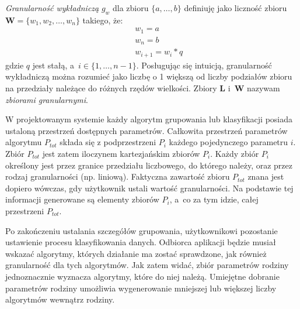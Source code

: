 \documentclass[../thesis.tex]{subfiles}
\begin{document}
\textit{Granularność wykładniczą} $g_w$ dla zbioru $\{a, \ldots, b\}$ definiuję jako liczność zbioru $\textbf{W} = \{w_1, w_2, \ldots, w_n\}$ takiego, że:
\begin{eqnarray*}
&& w_1 = a~\\
&& w_n = b \\
&& w_{i+1} = w_i * q
\end{eqnarray*}
gdzie $q$ jest stałą, a~$i \in \{1, \ldots, n-1\}$. Posługując się intuicją, granularność wykładniczą można rozumieć jako liczbę o 1 większą od liczby podziałów zbioru na przedziały należące do różnych rzędów wielkości. Zbiory $\textbf{L}$ i~$\textbf{W}$ nazywam \textit{zbiorami granularnymi}.

W projektowanym systemie każdy algorytm grupowania lub klasyfikacji posiada ustaloną przestrzeń dostępnych parametrów. Całkowita przestrzeń parametrów algorytmu $P_{tot}$ składa się z podprzestrzeni $P_i$ każdego pojedynczego parametru $i$. Zbiór $P_{tot}$ jest zatem iloczynem kartezjańskim zbiorów $P_i$. Każdy zbiór $P_i$ określony jest przez granice przedziału liczbowego, do którego należy, oraz przez rodzaj granularności (np. liniową). Faktyczna zawartość zbioru $P_{tot}$ znana jest dopiero wówczas, gdy użytkownik ustali wartość granularności. Na podstawie tej informacji generowane są elementy zbiorów $P_i$, a~co za tym idzie, całej przestrzeni $P_{tot}$.

Po zakończeniu ustalania szczegółów grupowania, użytkownikowi pozostanie ustawienie procesu klasyfikowania danych. Odbiorca aplikacji będzie musiał wskazać algorytmy, których działanie ma zostać sprawdzone, jak również granularność dla tych algorytmów. Jak zatem widać, zbiór parametrów rodziny jednoznacznie wyznacza algorytmy, które do niej należą. Umiejętne dobranie parametrów rodziny umożliwia wygenerowanie mniejszej lub większej liczby algorytmów wewnątrz rodziny.
\end{document}
